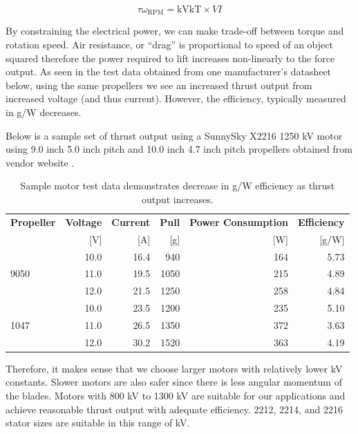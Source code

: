 $$
\tau\omega_{\mathrm{RPM}} = \mathrm{kV}\mathrm{kT}\times VI
$$

By constraining the electrical power, we can make trade-off between torque and rotation speed.
Air resistance, or “drag” is proportional to speed of an object squared therefore the power required to 
lift increases non-linearly to the force output. As seen in the test data obtained from one manufacturer’s 
datasheet below, using the same propellers we see an increased thrust output from increased voltage (and 
thus current). However, the efficiency, typically measured in g/W decreases. 

Below is a sample set of thrust output using a SunnySky X2216 1250 kV motor using 9.0 inch 5.0 inch pitch and 10.0 inch 4.7 inch pitch propellers obtained from vendor website \cite{sunnysky-2216}. 

\begin{table}[H]
    \centering
    \caption{Sample motor test data demonstrates decrease in g/W efficiency as thrust output increases.}
    \label{table:sunnyskyx2216-table}

    \begin{tabular}{lrrrrr}

    \hline
    \textbf{Propeller} & \textbf{Voltage} & \textbf{Current} & \textbf{Pull}  & \textbf{Power Consumption} & \textbf{Efficiency}\\
    & [V] & [A] & [g] & [W] & [g/W] \\
    \hline
     & 10.0 & 16.4 & 940 & 164 & 5.73 \\
    9050 & 11.0 & 19.5 & 1050 & 215 & 4.89 \\
     & 12.0 & 21.5 & 1250 & 258 & 4.84 \\
    \hline
     & 10.0 & 23.5 & 1200 & 235 & 5.10 \\
    1047 & 11.0 & 26.5 & 1350 & 372 & 3.63 \\
     & 12.0 & 30.2 & 1520 & 363 & 4.19 \\
    \hline

    \end{tabular} 
\end{table}

Therefore, it makes sense that we choose larger motors with relatively lower kV constants. Slower motors 
are also safer since there is less angular momentum of the blades. Motors with 800 kV to 1300 kV are 
suitable for our applications and achieve reasonable thrust output with adequate efficiency. 2212, 2214, 
and 2216 stator sizes are suitable in this range of kV.


